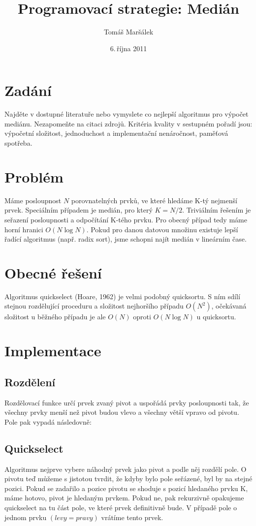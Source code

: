 \documentclass[11pt]{article}
\title{Programovací strategie: Medián}
\author{Tomáš Maršálek}
\date{6.\,října 2011}
\begin{document}
\maketitle

\section{Zadání}
Najděte v dostupné literatuře nebo vymyslete co nejlepší algoritmus pro výpočet mediánu. Nezapomeňte na citaci zdrojů. Kritéria kvality v sestupném pořadí jsou: výpočetní složitost, jednoduchost a implementační nenáročnost, paměťová spotřeba.

\section{Problém}
Máme posloupnost $N$ porovnatelných prvků, ve které hledáme K-tý nejmenší prvek.
Speciálním případem je medián, pro který $K = N/2$. Triviálním řešením je 
seřazení posloupnosti a odpočítání K-tého prvku. Pro obecný případ tedy 
máme horní hranici $O(N \log N)$. Pokud pro danou datovou množinu existuje lepší
řadící algoritmus (např. radix sort), jsme schopni najít medián v lineárním
čase.

\section{Obecné řešení}
Algoritmus quickselect (Hoare, 1962) je velmi podobný quicksortu. S ním sdílí
stejnou rozdělující proceduru a složitost nejhoršího případu $O(N^2)$, 
očekávaná složitost u běžného případu je ale $O(N)$ oproti $O(N \log N)$ 
u quicksortu.

\section{Implementace}
\subsection{Rozdělení}
Rozdělovací funkce určí prvek zvaný pivot a uspořádá prvky posloupnosti tak,
že všechny prvky menší než pivot budou vlevo a všechny větší vpravo od pivotu. 
Pole pak vypadá následovně:
\vspace{1cm}


\clearpage


\subsection{Quickselect}
Algoritmus nejprve vybere náhodný prvek jako pivot a podle něj rozdělí pole.
O pivotu teď můžeme s jistotou tvrdit, že kdyby bylo pole seřázené, byl by na 
stejné pozici.  Pokud se zadařilo a pozice pivotu se shoduje s pozicí 
hledaného prvku K, máme hotovo, pivot je hledaným prvkem. Pokud ne, pak 
rekurzivně opakujeme quickselect na tu část pole, ve které prvek definitivně 
bude. V případě pole o jednom prvku $(levy = pravy)$ vrátíme tento prvek.

\end{document}
